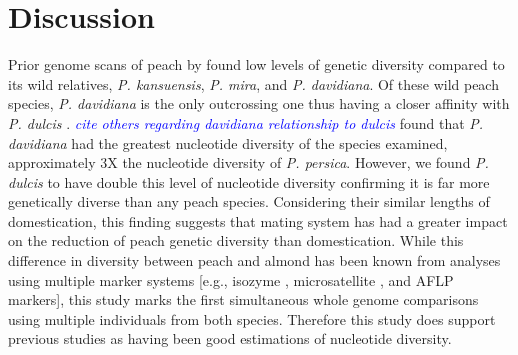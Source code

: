 \documentclass[12pt]{article}
\newcommand{\dv}[1]{\textcolor{blue}{\emph{#1}}}
\begin{document}
\section*{Discussion}
Prior genome scans of peach by \cite{verde2013high} found low levels of genetic diversity compared to its wild relatives, \emph{P. kansuensis}, \emph{P. mira}, and \emph{P. davidiana}. 
%
%
%
Of these wild peach species, \emph{P. davidiana} is the only outcrossing one thus having a closer affinity with \emph{P. dulcis} \citep{aradhya2004molecular}. \dv{cite others regarding davidiana relationship to dulcis} 
%
\cite{verde2013high} found that \emph{P. davidiana} had the greatest nucleotide diversity of the species examined, approximately 3X the nucleotide diversity of \emph{P. persica}.
%
However, we found \emph{P. dulcis} to have double this level of nucleotide diversity confirming it is far more genetically diverse than any peach species.
Considering their similar lengths of domestication, this finding suggests that mating system has had a greater impact on the reduction of peach genetic diversity than domestication.
%
While this difference in diversity between peach and almond has been known from analyses using multiple marker systems [e.g., isozyme \citep{mowrey1990isozyme, byrne1990isozyme}, microsatellite \citep{martinez2003extended}, and AFLP \citep{aradhya2004molecular} markers], this study marks the first simultaneous whole genome comparisons using multiple individuals from both species.
%
%
Therefore this study does support previous studies as having been good estimations of nucleotide diversity. 
\end{document}
